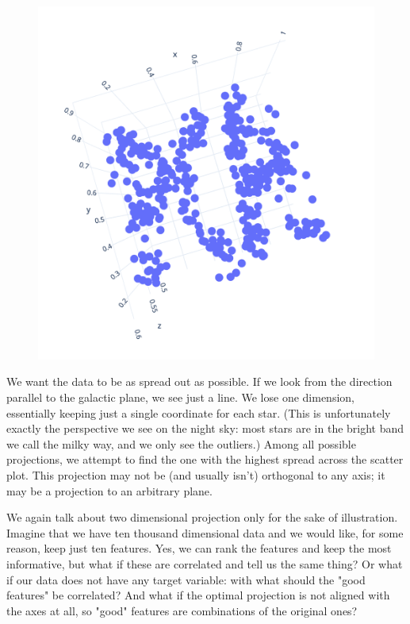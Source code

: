 \begin{figure}
    \includegraphics[scale=0.4]{pca-3d.png}
    \label{fig:pca3d}
\end{figure}

We want the data to be as spread out as possible. If we look from the direction parallel to the galactic plane, we see just a line. We lose one dimension, essentially keeping just a single coordinate for each star. (This is unfortunately exactly the perspective we see on the night sky: most stars are in the bright band we call the milky way, and we only see the outliers.) Among all possible projections, we attempt to find the one with the highest spread across the scatter plot. This projection may not be (and usually isn't) orthogonal to any axis; it may be a projection to an arbitrary plane.

\clearpage
\newpage

We again talk about two dimensional projection only for the sake of illustration. Imagine that we have ten thousand dimensional data and we would like, for some reason, keep just ten features. Yes, we can rank the features and keep the most informative, but what if these are correlated and tell us the same thing? Or what if our data does not have any target variable: with what should the "good features" be correlated? And what if the optimal projection is not aligned with the axes at all, so "good" features are combinations of the original ones?

